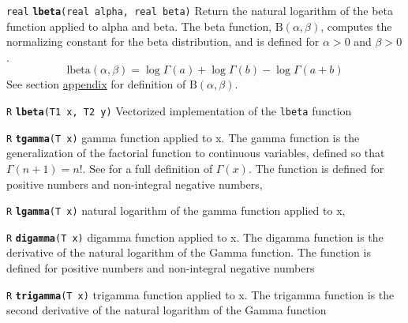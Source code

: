 \documentclass[
  10pt,
]{book}
\begin{document}

\texttt{real} \textbf{\texttt{lbeta}}\texttt{(real\ alpha,\ real\ beta)}\newline
Return the natural logarithm of the beta function applied to alpha and
beta. The beta function, \(\text{B}(\alpha,\beta)\), computes the
normalizing constant for the beta distribution, and is defined for
\(\alpha > 0\) and \(\beta > 0\). \[ \text{lbeta}(\alpha,\beta) = \log
\Gamma(a) + \log \Gamma(b) - \log \Gamma(a+b) \] See section
\protect\hyperlink{beta-appendix}{appendix} for definition of \(\text{B}(\alpha, \beta)\).


\texttt{R} \textbf{\texttt{lbeta}}\texttt{(T1\ x,\ T2\ y)}\newline
Vectorized implementation of the \texttt{lbeta} function


\texttt{R} \textbf{\texttt{tgamma}}\texttt{(T\ x)}\newline
gamma function applied to x. The gamma function is the generalization
of the factorial function to continuous variables, defined so that
\(\Gamma(n+1) = n!\). See for a full definition of \(\Gamma(x)\). The
function is defined for positive numbers and non-integral negative
numbers,


\texttt{R} \textbf{\texttt{lgamma}}\texttt{(T\ x)}\newline
natural logarithm of the gamma function applied to x,


\texttt{R} \textbf{\texttt{digamma}}\texttt{(T\ x)}\newline
digamma function applied to x. The digamma function is the derivative
of the natural logarithm of the Gamma function. The function is
defined for positive numbers and non-integral negative numbers


\texttt{R} \textbf{\texttt{trigamma}}\texttt{(T\ x)}\newline
trigamma function applied to x. The trigamma function is the second
derivative of the natural logarithm of the Gamma function
\end{document}
